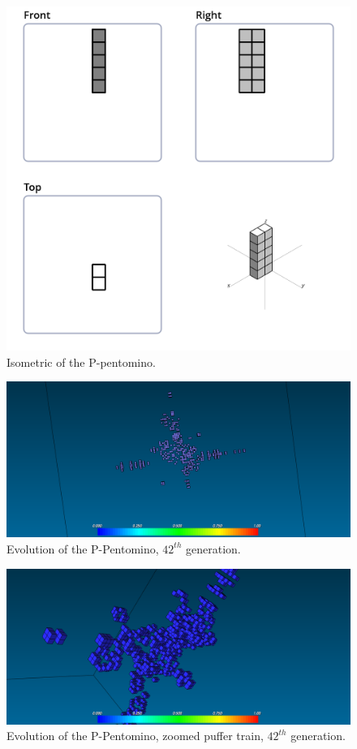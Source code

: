 \begin{figure}
	\centering
	\includegraphics[scale=0.3]{iso_diagrams/o.png}
	\caption{Isometric of the P-pentomino.}
  \label{fig:iso-pent-p}
\end{figure}


\begin{figure}
	\centering
	\includegraphics[scale=0.3]{pentominoes_ss/p_42.png}
	\caption{Evolution of the P-Pentomino, $42^{th}$ generation.}
  \label{fig:ss-pent:p-42}
\end{figure}

\begin{figure}
	\centering
	\includegraphics[scale=0.3]{pentominoes_ss/p_42_puffer.png}
	\caption{Evolution of the P-Pentomino, zoomed puffer train, $42^{th}$
	generation.}
  \label{fig:ss-pent:p-42}
\end{figure}

